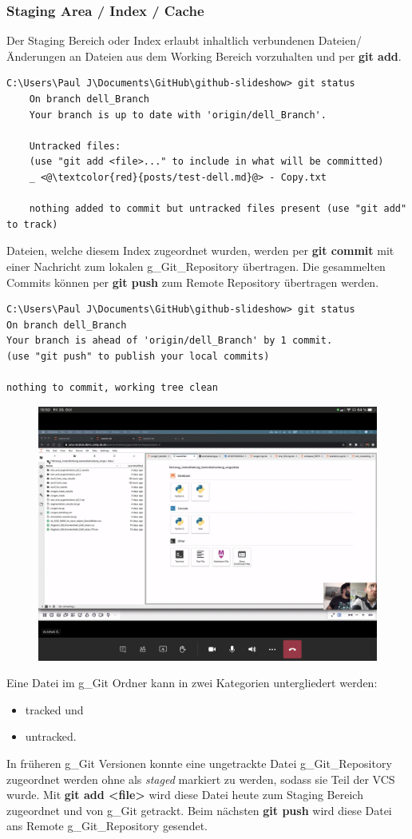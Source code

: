 \subsubsection{Staging Area / Index / Cache}
Der Staging Bereich oder Index erlaubt inhaltlich verbundenen Dateien/ Änderungen an Dateien aus dem Working Bereich vorzuhalten und per \textbf{git add}. 
\begin{lstlisting}[style=CMD]
	C:\Users\Paul J\Documents\GitHub\github-slideshow> git status
	On branch dell_Branch
	Your branch is up to date with 'origin/dell_Branch'.
	
	Untracked files:
	(use "git add <file>..." to include in what will be committed)
	_ <@\textcolor{red}{posts/test-dell.md}@> - Copy.txt

	nothing added to commit but untracked files present (use "git add" to track)
\end{lstlisting}
Dateien, welche diesem Index zugeordnet wurden, werden per \textbf{git commit} mit einer Nachricht zum lokalen \gls{g_Git_Repository} übertragen. Die gesammelten Commits können per \textbf{git push} zum Remote Repository übertragen werden.
\begin{lstlisting}[style=CMD]
C:\Users\Paul J\Documents\GitHub\github-slideshow> git status
On branch dell_Branch
Your branch is ahead of 'origin/dell_Branch' by 1 commit.
(use "git push" to publish your local commits)

nothing to commit, working tree clean
\end{lstlisting}
\begin{figure}[H]
	\centering
	\includegraphics[width=0.7\linewidth]{attachment/chapter_6/Scc000}
\end{figure}

Eine Datei im \gls{g_Git} Ordner kann in zwei Kategorien untergliedert werden:
\begin{itemize}
	\item tracked und
	\item untracked.
\end{itemize}
In früheren \gls{g_Git} Versionen konnte eine ungetrackte Datei \gls{g_Git_Repository} zugeordnet werden ohne als \textit{staged} markiert zu werden, sodass sie Teil der \gls{VCS} wurde. Mit \textbf{git add <file>} wird diese Datei heute zum Staging Bereich zugeordnet und von \gls{g_Git} getrackt. Beim nächsten \textbf{git push} wird diese Datei ans Remote \gls{g_Git_Repository} gesendet.


